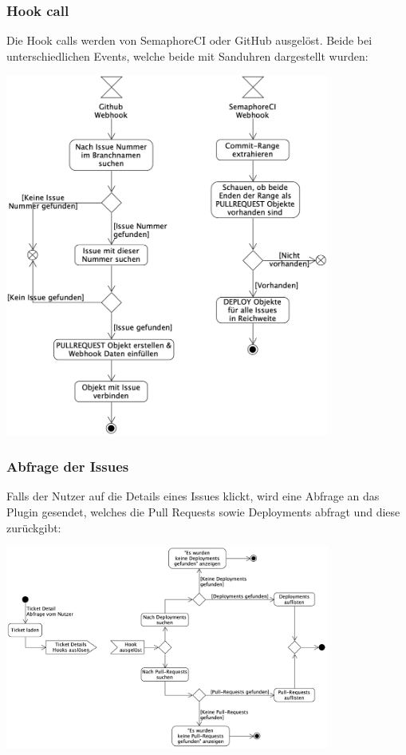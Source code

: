 \begin{minipage}{\textwidth}
  \subsubsection{Hook call}
  Die Hook calls werden von SemaphoreCI oder GitHub ausgelöst. Beide bei unterschiedlichen Events, welche beide mit Sanduhren
  dargestellt wurden:
  \begin{center}
    \includegraphics[width=0.8\textwidth]{images/activity/webhook.png}
    \label{fig:activity_hook_call}
  \end{center}
\end{minipage}

\begin{minipage}{\textwidth}
  \subsubsection{Abfrage der Issues}
  Falls der Nutzer auf die Details eines Issues klickt, wird eine Abfrage an das Plugin gesendet, welches die Pull Requests sowie
  Deployments abfragt und diese zurückgibt: \newline
  \begin{center}
    \includegraphics[width=0.8\textwidth]{images/activity/issues-view.png}
    \label{fig:activity_issues}
  \end{center}
\end{minipage}

